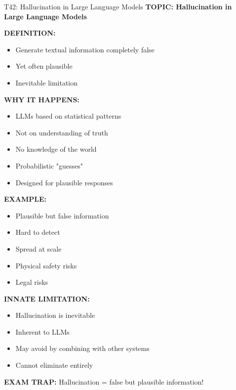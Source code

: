 \documentclass[8pt]{beamer}
\begin{document}
	\begin{frame}{T42: Hallucination in Large Language Models}
		\fontsize{6.5}{7.5}\selectfont
		\textbf{TOPIC: Hallucination in Large Language Models}
		
		\vspace{0.1cm}
		\textbf{DEFINITION:}
		\begin{itemize}
			\item Generate textual information completely false
			\item Yet often plausible
			\item Inevitable limitation
		\end{itemize}
		
		\vspace{0.1cm}
		\textbf{WHY IT HAPPENS:}
		\begin{itemize}
			\item LLMs based on statistical patterns
			\item Not on understanding of truth
			\item No knowledge of the world
			\item Probabilistic "guesses"
			\item Designed for plausible responses
		\end{itemize}
		
		\vspace{0.1cm}
		\textbf{EXAMPLE:}
		\begin{itemize}
			\item Plausible but false information
			\item Hard to detect
			\item Spread at scale
			\item Physical safety risks
			\item Legal risks
		\end{itemize}
		
		\vspace{0.1cm}
		\textbf{INNATE LIMITATION:}
		\begin{itemize}
			\item Hallucination is inevitable
			\item Inherent to LLMs
			\item May avoid by combining with other systems
			\item Cannot eliminate entirely
		\end{itemize}
		
		\textcolor{myred}{\textbf{EXAM TRAP:}} Hallucination = \textcolor{myblue}{false but plausible information}!
	\end{frame}
	
\end{document}

